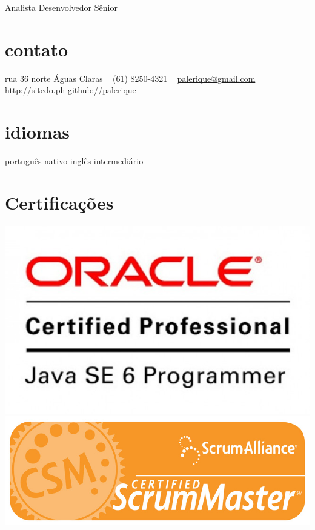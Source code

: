 \documentclass[]{friggeri-cv}
\begin{document}
       {Analista Desenvolvedor Sênior}


\begin{aside}
  \section{contato}
    rua 36 norte
    Águas Claras
    ~
    (61) 8250-4321
    ~
    \href{mailto:palerique@gmail.com}{palerique@gmail.com}
    \href{http://sitedo.ph}{http://sitedo.ph}
    \href{http://github.com/palerique/}{github://palerique}
  \section{idiomas}
    português nativo
    inglês intermediário
  \section{Certificações}
    \includegraphics[scale=0.13]{ocpjp.jpg}
    \includegraphics[scale=0.13]{csm.png}
\end{aside}
\end{document}
